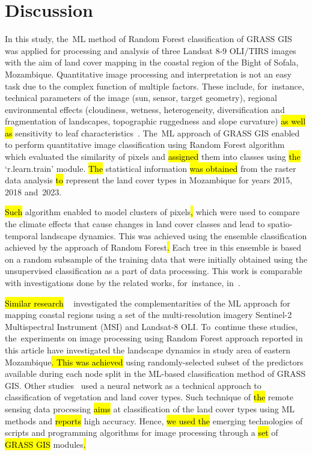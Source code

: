 \documentclass[coasts,article,accept,pdftex,oneauthor]{Definitions/mdpi}
\begin{document}
\section{Discussion}

In this study, the~ML method of Random Forest classification of GRASS GIS was applied for {processing and analysis of }three Landsat 8-9 OLI/TIRS images {with the aim of }land cover mapping {in} the coastal region of the Bight of Sofala, Mozambique. Quantitative image processing and interpretation is not an easy {task} due to the complex function of {multiple factors. These include, for~instance, }technical parameters of the image (sun, sensor, target geometry), regional environmental effects (cloudiness, wetness, {heterogeneity, }diversification and fragmentation of landscapes,\hl{ }topographic ruggedness and slope curvature) \hl{as well as} sensitivity to leaf characteristics~\cite{Mitchard}. The~ML approach of GRASS GIS enabled\hl{ }to perform quantitative image classification using Random Forest algorithm\hl{ }which evaluated the similarity of pixels and \hl{assigned} them into classes using \hl{the} `r.learn.train' module. \hl{The} statistical information \hl{was obtained }from the raster data analysis \hl{to }represent\hl{ }the land cover types in Mozambique for{ }years 2015, 2018 and~2023. 

\hl{Such} algorithm enabled to model\hl{ }clusters of pixels\hl{, }which {were} used to compare the climate effects {that cause} changes in land cover classes and {lead to spatio-temporal }landscape {dynamics}. This was achieved using the ensemble classification {achieved by the approach of Random Forest}\hl{. }Each tree in {this} ensemble is based on a random subsample of the training data that were initially obtained using {the }unsupervised classification as a part of data processing. This work is comparable with investigations done by {the }related works{, for~instance,} in~\cite{FERNANDO2023,KOLARIK2024111445}. 

\hl{Similar research} ~\cite{BERA20234691,land12122149,ZHANG2023108250} investigated the complementarities of the ML approach for mapping coastal regions using a set of {the }multi-resolution imagery Sentinel-2 Multispectral Instrument (MSI) and Landsat-8 OLI. To~continue these studies, the~experiments on image processing using Random Forest approach reported in this article have investigated the landscape dynamics in study area of eastern Mozambique\hl{. This was achieved }using randomly-selected subset of the predictors available during each node split in the ML-based classification method of GRASS GIS. Other studies~\cite{MOUNTRAKIS2023106,SINGH2021100645,ZHENG2023100974} used a neural network {as a technical approach to classification of} vegetation and land cover {types. Such }technique {of} \hl{the} remote sensing data processing {\hl{aims} at classification of the }land cover types using ML methods and \hl{reports} high accuracy. {Hence, \hl{we used the} emerging technologies of scripts and programming algorithms for image processing through a \hl{set} of \hl{GRASS GIS} modules\hl{.}}
\end{document}
